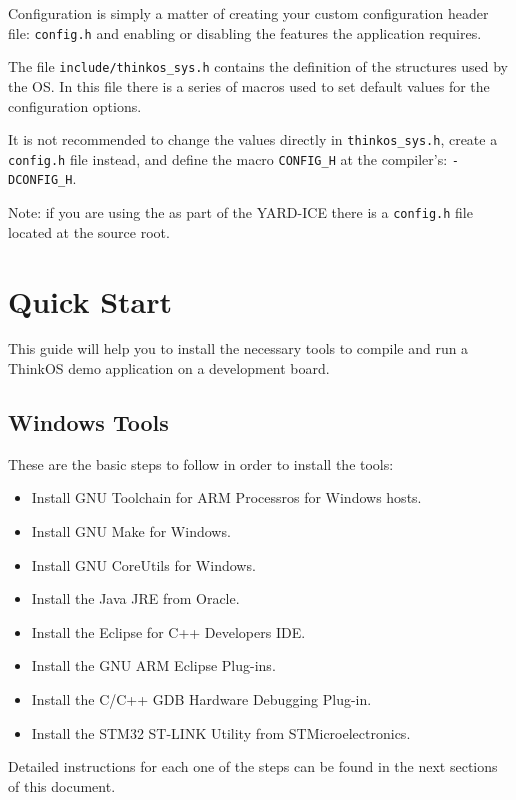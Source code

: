 Configuration is simply a matter of creating your custom configuration header file: \lstinline{config.h} and enabling or disabling the features the application requires.

The file \lstinline{include/thinkos_sys.h} contains the definition of the structures used by the OS. In this file there is a series of macros used to set default values for the configuration options.

It is not recommended to change the values directly in \lstinline{thinkos_sys.h}, create a \lstinline{config.h} file instead, and define the macro \lstinline{CONFIG_H} at the compiler's: \lstinline{-DCONFIG_H}.

Note: if you are using the \ThinkOS as part of the YARD-ICE there is a \lstinline{config.h} file located at the source root.



\section {Quick Start}

This guide will help you to install the necessary tools to compile and run a ThinkOS demo application on a development board.

\subsection{Windows Tools}

These are the basic steps to follow in order to install the tools: 

\begin{itemize}
\item Install GNU Toolchain for ARM Processros for Windows hosts.
\item Install GNU Make for Windows.
\item Install GNU CoreUtils for Windows.
\item Install the Java JRE from Oracle.
\item Install the Eclipse for C++ Developers IDE.
\item Install the GNU ARM Eclipse Plug-ins.
\item Install the C/C++ GDB Hardware Debugging Plug-in.
\item Install the STM32 ST-LINK Utility from STMicroelectronics.
\end{itemize}

Detailed instructions for each one of the steps can be found in the next sections of this document. 

